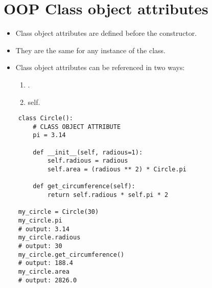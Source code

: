 \section{OOP Class object attributes}
\begin{itemize}
    \item Class object attributes are defined before the constructor.
    \item They are the same for any instance of the class. 
    \item Class object attributes can be referenced in two ways: 
        \begin{enumerate}
            \item {}. 
            \item self.     
        \end{enumerate}
\end{itemize}
\begin{verbatim}
    class Circle():
        # CLASS OBJECT ATTRIBUTE 
        pi = 3.14

        def __init__(self, radious=1):
            self.radious = radious
            self.area = (radious ** 2) * Circle.pi

        def get_circumference(self):
            return self.radious * self.pi * 2

    my_circle = Circle(30)
    my_circle.pi
    # output: 3.14
    my_circle.radious
    # output: 30
    my_circle.get_circumference()
    # output: 188.4
    my_circle.area
    # output: 2826.0
\end{verbatim}


